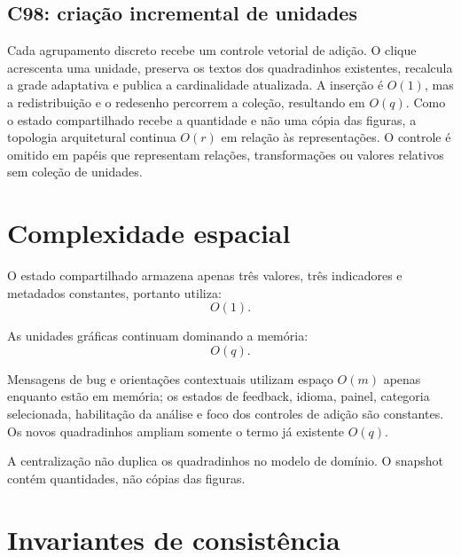 \documentclass[12pt,a4paper]{article}
\begin{document}
\subsection{C98: criação incremental de unidades}
Cada agrupamento discreto recebe um controle vetorial de adição. O clique acrescenta uma unidade, preserva os textos dos quadradinhos existentes, recalcula a grade adaptativa e publica a cardinalidade atualizada. A inserção é $O(1)$, mas a redistribuição e o redesenho percorrem a coleção, resultando em $O(q)$. Como o estado compartilhado recebe a quantidade e não uma cópia das figuras, a topologia arquitetural continua $O(r)$ em relação às representações. O controle é omitido em papéis que representam relações, transformações ou valores relativos sem coleção de unidades.

\section{Complexidade espacial}

O estado compartilhado armazena apenas três valores, três indicadores e metadados constantes, portanto utiliza:
\[
O(1).
\]

As unidades gráficas continuam dominando a memória:
\[
O(q).
\]

Mensagens de bug e orientações contextuais utilizam espaço $O(m)$ apenas enquanto estão em memória; os estados de feedback, idioma, painel, categoria selecionada, habilitação da análise e foco dos controles de adição são constantes. Os novos quadradinhos ampliam somente o termo já existente $O(q)$.

A centralização não duplica os quadradinhos no modelo de domínio. O snapshot contém quantidades, não cópias das figuras.

\section{Invariantes de consistência}
\end{document}
